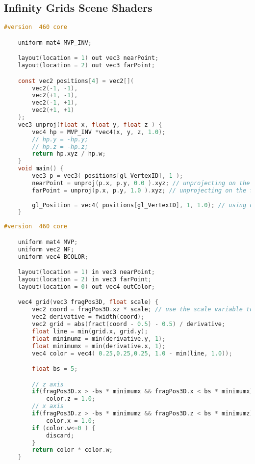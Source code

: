 \begin{appendices}
\chapter{Infinity Grids Scene Shaders}
\label{ap:scene}

\begin{lstlisting}[language=C, caption = Vertex shader of Infinity Grids Scene]
	#version  460 core

	uniform mat4 MVP_INV;

	layout(location = 1) out vec3 nearPoint;
	layout(location = 2) out vec3 farPoint;

	const vec2 positions[4] = vec2[](
		vec2(-1, -1),
		vec2(+1, -1),
		vec2(-1, +1),
		vec2(+1, +1)
	);
	vec3 unproj(float x, float y, float z ) {
		vec4 hp = MVP_INV *vec4(x, y, z, 1.0);  
		// hp.y = -hp.y;
		// hp.z = -hp.z;
		return hp.xyz / hp.w;
	}
	void main() {
		vec3 p = vec3( positions[gl_VertexID], 1 ); 
		nearPoint = unproj(p.x, p.y, 0.0 ).xyz; // unprojecting on the near plane
		farPoint = unproj(p.x, p.y, 1.0 ).xyz; // unprojecting on the far plane
		
		gl_Position = vec4( positions[gl_VertexID], 1, 1.0); // using directly the clipped coordinates
	}
\end{lstlisting}

\clearpage

\begin{lstlisting}[language=C, caption = Fragment shader of Infinity Grids Scene]
	#version  460 core

	uniform mat4 MVP;
	uniform vec2 NF;
	uniform vec4 BCOLOR;

	layout(location = 1) in vec3 nearPoint;
	layout(location = 2) in vec3 farPoint;
	layout(location = 0) out vec4 outColor;

	vec4 grid(vec3 fragPos3D, float scale) {
		vec2 coord = fragPos3D.xz * scale; // use the scale variable to set the distance between the lines
		vec2 derivative = fwidth(coord);
		vec2 grid = abs(fract(coord - 0.5) - 0.5) / derivative;
		float line = min(grid.x, grid.y);
		float minimumz = min(derivative.y, 1);
		float minimumx = min(derivative.x, 1);
		vec4 color = vec4( 0.25,0.25,0.25, 1.0 - min(line, 1.0));

		float bs = 5;

		// z axis
		if(fragPos3D.x > -bs * minimumx && fragPos3D.x < bs * minimumx)
			color.z = 1.0;
		// x axis
		if(fragPos3D.z > -bs * minimumz && fragPos3D.z < bs * minimumz)
			color.x = 1.0;
		if (color.w<=0 ) {
			discard;
		}
		return color * color.w;
	}



\end{lstlisting}
\end{appendices}

